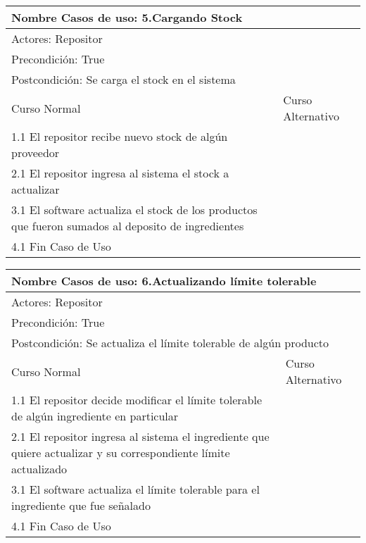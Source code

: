 \documentclass[a4paper,10pt]{article}
\begin{document}
\begin{center}
\begin{tabularx}{14cm}{|X|X|}
\hline
\multicolumn{2}{|l|}{Nombre Casos de uso: 5.Cargando Stock}\\
\hline
\multicolumn{2}{|l|}{Actores: Repositor}\\
\hline
\multicolumn{2}{|l|}{Precondici\'on: True}\\
\hline
\multicolumn{2}{|l|}{Postcondici\'on: Se carga el stock en el sistema}\\
\hline
Curso Normal & Curso Alternativo\\
\hline
1.1 El repositor recibe nuevo stock de alg\'un proveedor & 
\\
\hline
2.1 El repositor ingresa al sistema el stock a actualizar & 
\\
\hline
3.1 El software actualiza el stock de los productos que fueron sumados al deposito de ingredientes &
\\
\hline
4.1 Fin Caso de Uso &
\\
\hline
\end{tabularx}
\end{center}


\bigskip

\begin{center}
\begin{tabularx}{14cm}{|X|X|}
\hline
\multicolumn{2}{|l|}{Nombre Casos de uso: 6.Actualizando l\'imite tolerable}\\
\hline
\multicolumn{2}{|l|}{Actores: Repositor}\\
\hline
\multicolumn{2}{|l|}{Precondici\'on: True}\\
\hline
\multicolumn{2}{|l|}{Postcondici\'on: Se actualiza el l\'imite tolerable de alg\'un producto}\\
\hline
Curso Normal & Curso Alternativo\\
\hline
1.1 El repositor decide modificar el l\'imite tolerable de alg\'un ingrediente en particular & 
\\
\hline
2.1 El repositor ingresa al sistema el ingrediente que quiere actualizar y su correspondiente l\'imite actualizado & 
\\
\hline
3.1 El software actualiza el l\'imite tolerable para el ingrediente que fue se\~{n}alado &
\\
\hline
4.1 Fin Caso de Uso &
\\
\hline
\end{tabularx}
\end{center}
\end{document}
